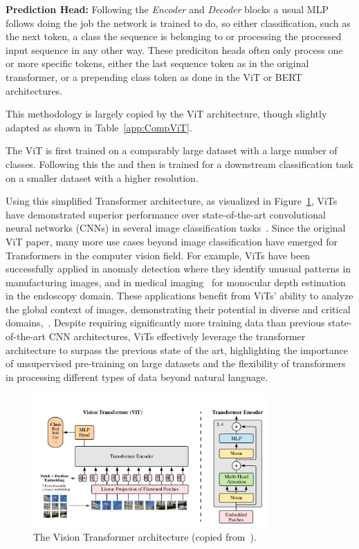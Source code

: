 \textbf{Prediction Head:}
Following the \emph{Encoder} and \emph{Decoder} blocks a usual MLP follows doing the job the network is trained to do, so either classification, such as the next token, a class the sequence is belonging to or processing the processed input sequence in any other way.
These prediciton heads often only process one or more specific tokens, either the last sequence token as in the original transformer, or a prepending class token as done in the ViT or BERT architectures.

This methodology is largely copied by the ViT architecture, though slightly adapted as shown in Table~\ref{app:CompViT}.

The ViT is first trained on a comparably large dataset with a large number of classes. 
Following this the  and then is trained for a downstream classification task on a smaller dataset with a higher resolution. 

Using this simplified Transformer architecture, as visualized in Figure~\ref{fig:vit}, ViTs have demonstrated superior performance over state-of-the-art convolutional neural networks (CNNs) in several image classification tasks~\cite{Mauricio2023}. 
Since the original ViT paper, many more use cases beyond image classification have emerged for Transformers in the computer vision field. 
For example, ViTs have been successfully applied in anomaly detection where they identify unusual patterns in manufacturing images, and in medical imaging~\cite{Ranftl2021} for monocular depth estimation in the endoscopy domain. 
These applications benefit from ViTs' ability to analyze the global context of images, demonstrating their potential in diverse and critical domains,~\cite{Jamil2023}.
Despite requiring significantly more training data than previous state-of-the-art CNN architectures, ViTs effectively leverage the transformer architecture to surpass the previous state of the art, highlighting the importance of unsupervised pre-training on large datasets and the flexibility of transformers in processing different types of data beyond natural language.
\begin{figure}
    \centering
    \includegraphics[width=0.8\textwidth]{images/vit_overview.png}
    \caption[The Vision Transformer architecture]{The Vision Transformer architecture (copied from~\cite{Dosovitskiy2020}).}\label{fig:vit}
\end{figure}

